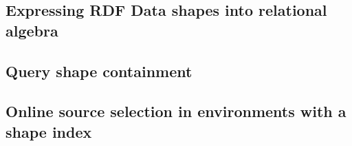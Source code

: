 \subsection{Expressing RDF Data shapes into relational algebra}

\subsection{Query shape containment}

\subsection{Online source selection in environments with a shape index}